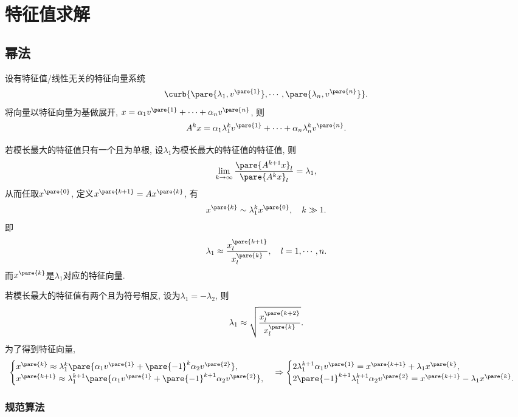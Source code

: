 \documentclass[hidelinks]{ctexart}
\begin{document}
\section{特征值求解} %
\label{sec:特征值求解}

\subsection{幂法} %
\label{sub:幂法}

设有特征值/线性无关的特征向量系统
\[ \curb{\pare{\lambda_1,v^{\pare{1}}},\cdots,\pare{\lambda_n,v^{\pare{n}}}}. \]
将向量以特征向量为基做展开, $x = \alpha_1 v^{\pare{1}} + \cdots + \alpha_n v^{\pare{n}}$, 则
\[ A^k x = \alpha_1 \lambda_1^k v^{\pare{1}} + \cdots + \alpha_n \lambda_n^k v^{\pare{n}}. \]
\par
若模长最大的特征值只有一个且为单根, 设$\lambda_1$为模长最大的特征值的特征值, 则
\[ \lim_{k\rightarrow \infty} \frac{\pare{A^{k+1} x}_l}{\pare{A^k x}_l} = \lambda_1, \]
从而任取$x^{\pare{0}}$, 定义$x^{\pare{k+1}} = Ax^{\pare{k}}$, 有
\[ x^{\pare{k}}\sim \lambda_1^k x^{\pare{0}},\quad k\gg 1. \]
即
\[ \lambda_1 \approx \frac{x^{\pare{k+1}}_l}{x^{\pare{k}}_l},\quad l = 1,\cdots,n. \]
而$x^{\pare{k}}$是$\lambda_1$对应的特征向量.
\par
若模长最大的特征值有两个且为符号相反, 设为$\lambda_1 = -\lambda_2$, 则
\[ \lambda_1 \approx \sqrt{\frac{x_l^{\pare{k+2}}}{x_l^{\pare{k}}}}. \]
为了得到特征向量,
\[ \begin{cases}
    x^{\pare{k}} \approx \lambda_1^k \pare{\alpha_1 v^{\pare{1}} + \pare{-1}^k \alpha_2 v^{\pare{2}}}, \\
    x^{\pare{k+1}} \approx \lambda_1^{k+1} \pare{\alpha_1 v^{\pare{1}} + \pare{-1}^{k+1} \alpha_2 v^{\pare{2}}},
\end{cases} \Rightarrow \begin{cases}
    2\lambda_1^{k+1}\alpha_1 v^{\pare{1}} = x^{\pare{k+1}} + \lambda_1 x^{\pare{k}}, \\
    2\pare{-1}^{k+1}\lambda_1^{k+1}\alpha_2v^{\pare{2}} = x^{\pare{k+1}} - \lambda_1 x^{\pare{k}}.
\end{cases} \]

\subsubsection{规范算法} %
\label{ssub:规范算法}
\end{document}
